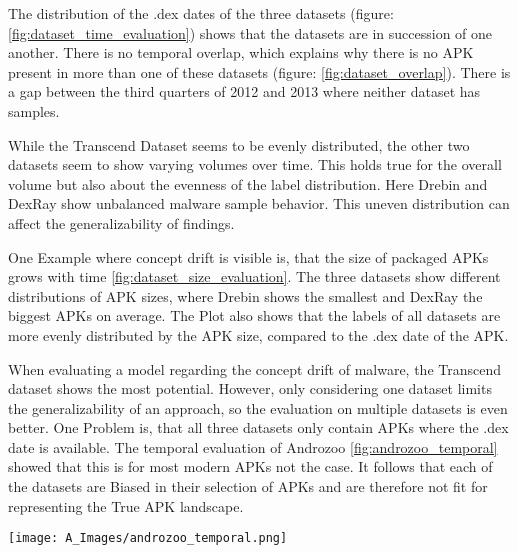 The distribution of the .dex dates of the three datasets 
(figure: \ref{fig:dataset_time_evaluation}) shows that the datasets are in succession of one another. 
There is no temporal overlap, which explains why there is no APK present in more than one of 
these datasets (figure: \ref{fig:dataset_overlap}). 
There is a gap between the third quarters of 2012 and 2013 where neither dataset has samples. 

While the Transcend Dataset seems to be evenly distributed, 
the other two datasets seem to show varying volumes over time. 
This holds true for the overall volume but also about the evenness of the label distribution. 
Here Drebin and DexRay show unbalanced malware sample behavior. 
This uneven distribution can affect the generalizability of findings.

One Example where concept drift is visible is, 
that the size of packaged APKs grows with time \ref{fig:dataset_size_evaluation}.
The three datasets show different distributions of APK sizes, 
where Drebin shows the smallest and DexRay the biggest APKs on average.
The Plot also shows that the labels of all datasets are more evenly distributed by the APK size, 
compared to the .dex date of the APK.

When evaluating a model regarding the concept drift of malware, 
the Transcend dataset shows the most potential.
However, only considering one dataset limits the generalizability of an approach, 
so the evaluation on multiple datasets is even better.
One Problem is, that all three datasets only contain APKs where the .dex date is available.
The temporal evaluation of Androzoo \ref{fig:androzoo_temporal} showed that this is for most 
modern APKs not the case.
It follows that each of the datasets are Biased in their selection of APKs and are 
therefore not fit for representing the True APK landscape. 

\begin{figure*}[b!]
    \centering
    \begin{minipage}{1.5\textwidth}
        \centering
        \texttt{[image: A\_Images/androzoo\_temporal.png]}
        \captionsetup{width=\textwidth}
        \caption{\label{fig:androzoo_temporal}
        Temporal distribution of APKs based on three key attributes: 
        classes.dex metadata, Virustotal Scan, and Androzoo Added. 
        The red bars (classes.dex metadata) show a large spike in 1980 to 1982, 
        likely due to incorrect or missing metadata values. 
        The blue (year of first scan by virustotal on that APK) and 
        green (year this APK was added to the androzoo repository) bars 
        indicate a consistent increase in APK activity from 2010 onward, 
        peaking around 2020 to 2022, reflecting the growing adoption of Android 
        and corresponding malware collection efforts. 
        The discrepancies between attributes highlight potential issues in 
        dataset metadata accuracy and consistency.
        }
    \end{minipage}
\end{figure*}


